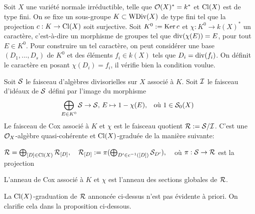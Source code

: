 \begin{cons}\label{conscoxtorsion}
Soit $X$ une variété normale irréductible, telle que $\mathcal{O}(X)^*=k^*$ et $\operatorname{Cl}(X)$ est de type fini. On se fixe un sous-groupe $K\subset \operatorname{WDiv}(X)$ de type fini tel que la projection $c:K\rightarrow \operatorname{Cl}(X)$ soit surjective. Soit $K^0:=\operatorname{Ker} c$ et $\chi:K^0\rightarrow k(X)^*$ un caractère, c'est-à-dire un morphisme de groupes tel que $\operatorname{div}(\chi(E))=E$, pour tout $E\in K^0$. Pour construire un tel caractère, on peut considérer une base $(D_1,...,D_s)$ de $K^0$ et des éléments $f_i\in k(X)$ tels que $D_i=\operatorname{div}(f_i)$. On définit le caractère en posant $\chi(D_i)=f_i$, il vérifie bien la condition voulue.

Soit $\mathcal{S}$ le faisceau d'algèbres divisorielles sur $X$ associé à $K$. Soit $\mathcal{I}$ le faisceau d'idéaux de $\mathcal{S}$ défini par l'image du morphisme 
$$\bigoplus_{E\in K^0}\mathcal{S}\rightarrow \mathcal{S},\, E\mapsto 1-\chi(E),\,\,\, \text{ où }1\in \mathcal{S}_0(X)$$
Le faisceau de Cox associé à $K$ et $\chi$ est le faisceau quotient $\mathcal{R}:=\mathcal{S}/\mathcal{I}$. C'est une $\mathcal{O}_X$-algèbre quasi-cohérente et $\operatorname{Cl}(X)$-graduée de la manière suivante: 
\begin{center}
$\mathcal{R}=\bigoplus_{[D]\in \operatorname{Cl}(X)}\mathcal{R}_{[D]},\,\,\,\,\,\, \mathcal{R}_{[D]}:=\pi(\bigoplus_{D'\in c^{-1}([D])}\mathcal{S}_{D'}),\,\,\,\,\,$ où $\pi:\mathcal{S}\rightarrow \mathcal{R}$ est la projection
\end{center}

\noindent L'anneau de Cox associé à $K$ et $\chi$ est l'anneau des sections globales de $\mathcal{R}$.
\end{cons}

La $\operatorname{Cl}(X)$-graduation de $\mathcal{R}$ annoncée ci-dessus n'est pas évidente à priori. On clarifie cela dans la proposition ci-dessous.

